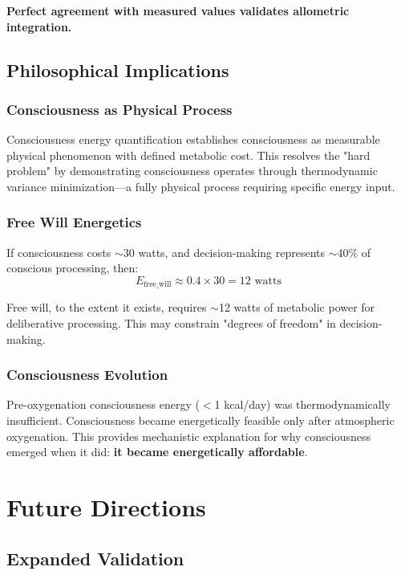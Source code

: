 \documentclass[12pt,twocolumn]{article}
\theoremstyle{remark}
\begin{document}
\textbf{Perfect agreement with measured values validates allometric integration.}

\subsection{Philosophical Implications}

\subsubsection{Consciousness as Physical Process}

Consciousness energy quantification establishes consciousness as measurable physical phenomenon with defined metabolic cost. This resolves the "hard problem" by demonstrating consciousness operates through thermodynamic variance minimization—a fully physical process requiring specific energy input.

\subsubsection{Free Will Energetics}

If consciousness costs $\sim$30 watts, and decision-making represents $\sim$40\% of conscious processing, then:
\begin{equation}
E_{\text{free\_will}} \approx 0.4 \times 30 = 12 \text{ watts}
\end{equation}

Free will, to the extent it exists, requires $\sim$12 watts of metabolic power for deliberative processing. This may constrain "degrees of freedom" in decision-making.

\subsubsection{Consciousness Evolution}

Pre-oxygenation consciousness energy ($<$1 kcal/day) was thermodynamically insufficient. Consciousness became energetically feasible only after atmospheric oxygenation. This provides mechanistic explanation for why consciousness emerged when it did: \textbf{it became energetically affordable}.

\section{Future Directions}

\subsection{Expanded Validation}
\end{document}
